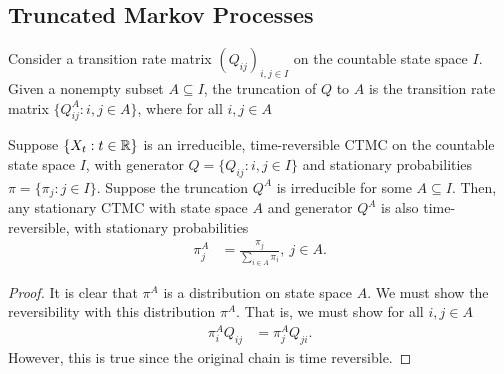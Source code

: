 \documentclass[a4paper,10pt,english]{article}
\begin{document}
\subsection{Truncated Markov Processes}
Consider a transition rate matrix $(Q_{ij})_{i, j \in I}$ on the countable state space $I$. 
Given a nonempty subset $A \subseteq I$, the truncation of $Q$ to $A$ is the transition rate matrix $\{Q^A_{ij}: i, j \in A\}$, where for all $i, j \in A$

\begin{prop}
Suppose $\{X_t: t \in \mathbb{R}\}$ is an irreducible, time-reversible CTMC on the countable state space $I$, 
with generator $Q = \{Q_{ij}: i, j \in I\}$ and stationary probabilities $\pi = \{\pi_j: j \in I\}$. 
Suppose the truncation $Q^A$ is irreducible for some $A \subseteq I$. 
Then, any stationary CTMC with state space $A$ and generator $Q^A$ is also time-reversible, with stationary probabilities
\begin{align*}
\pi_j^A&=\frac{\pi_j}{\sum_{i \in A}\pi_i},~ j \in A.
\end{align*}
\end{prop}
\begin{proof}
It is clear that $\pi^A$ is a distribution on state space $A$. 
We must show the reversibility with this distribution $\pi^A$. 
That is, we must show for all $i, j \in A$
\begin{align*}
\pi_i^AQ_{ij}&=\pi_j^AQ_{ji}.
\end{align*}
However, this is true since the original chain is time reversible.
\end{proof}
\end{document}
